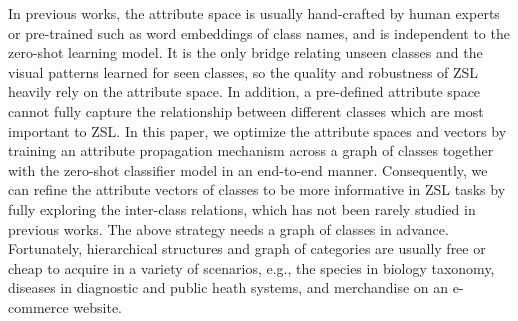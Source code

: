\documentclass[letterpaper]{article} %
\begin{document}
In previous works, the attribute space is usually hand-crafted by human experts or pre-trained such as word embeddings of class names, and is independent to the zero-shot learning model. It is the only bridge relating unseen classes and the visual patterns learned for seen classes, so the quality and robustness of ZSL heavily rely on the attribute space. In addition, a pre-defined attribute space cannot fully capture the relationship between different classes which are most important to ZSL.
In this paper, we optimize the attribute spaces and vectors by training an attribute propagation mechanism across a graph of classes together with the zero-shot classifier model in an end-to-end manner. Consequently, we can refine the attribute vectors of classes to be more informative in ZSL tasks by fully exploring the inter-class relations, which has not been rarely studied in previous works.
The above strategy needs a graph of classes in advance. Fortunately, hierarchical structures and graph of categories are usually free or cheap to acquire in a variety of scenarios, e.g., the species in biology taxonomy, diseases in diagnostic and public heath systems, and merchandise on an e-commerce website.
\end{document}
